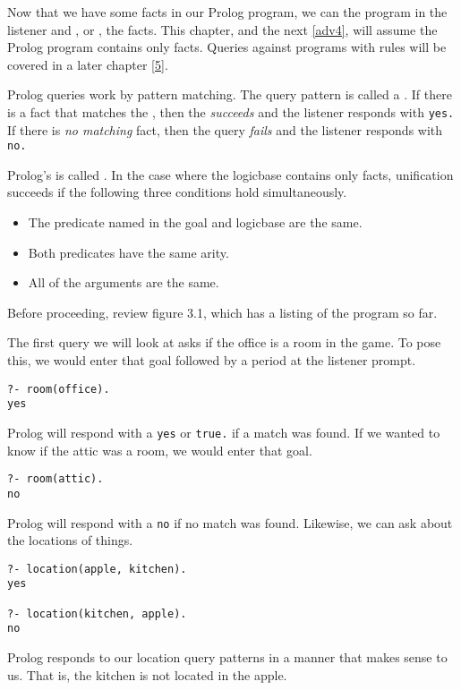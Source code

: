 \label{adv3}\secdown

Now that we have some facts in our Prolog program, we can
 the program in the listener and
, or , the facts. This
chapter, and the next \ref{adv4}, will assume the Prolog program contains only
facts. Queries against programs with rules will be covered in a later chapter
\ref{5}.

Prolog queries work by pattern matching. The query pattern is called a
. If there is a fact that matches the ,
then the  \emph{succeeds} and the listener responds with
\verb'yes.' If there is \emph{no matching} fact, then the
query \emph{fails} and the listener responds with \verb'no.'

Prolog's  is called
. In the case where the logicbase
contains only facts, unification succeeds if the following three conditions hold
simultaneously.
\begin{itemize}[nosep]
  \item 
The predicate named in the goal and logicbase are the same.
  \item 
Both predicates have the same arity.
  \item 
All of the arguments are the same.
\end{itemize}

Before proceeding, review figure 3.1, which has a listing of the program so far.


The first query we will look at asks if the office is a room in the game. To
pose this, we would enter that goal followed by a period at the listener prompt.
\begin{verbatim}
?- room(office).
yes
\end{verbatim}

Prolog will respond with a \verb'yes' or \verb'true.' if a match was found. If
we wanted to know if the attic was a room, we would enter that goal.
\begin{verbatim}
?- room(attic).
no
\end{verbatim}

Prolog will respond with a \verb'no' if no match was found. Likewise, we can ask
about the locations of things.
\begin{verbatim}
?- location(apple, kitchen).
yes

?- location(kitchen, apple).
no
\end{verbatim}
Prolog responds to our location query patterns in a manner that makes sense to
us. That is, the kitchen is not located in the apple.

